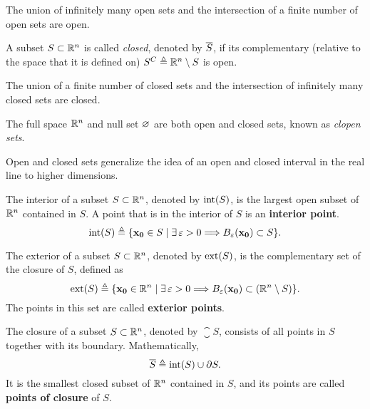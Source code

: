 \begin{prop}
The union of infinitely many open sets and the intersection of a finite number of open sets are open.
\end{prop}

\begin{defn}
	A subset $S\subset\Rtn$ is called \textit{closed}, denoted by $\overline{S}$, if its complementary (relative to the space that it is defined on) $S^C \bydef\Rtn\setminus S$ is open. 
\end{defn}

\begin{prop}
The union of a finite number of closed sets and the intersection of infinitely many closed sets are closed.
\end{prop}

\begin{prop}
    The full space $\Rtn$ and null set $\O$ are both open and closed sets, known as \textit{clopen sets}.
\end{prop}

Open and closed sets generalize the idea of an open and closed interval in the real line to higher dimensions.

\begin{defn}[Interior]
	The interior of a subset $S\subset\Rtn$, denoted by $\interior{S}$, is the largest open subset of $\Rtn$ contained in $S$. 
	A point that is in the interior of $S$ is an \textbf{interior point}.
	\begin{equation}
		\interior{S}\bydef\{\vec{x_0}\in S\st\exists\epsilon > 0\implies B_\epsilon\argopen(\vec{x_0}\argclose)\subset S\}.
	\end{equation}
\end{defn}

\begin{defn}[Exterior]
	The exterior of a subset $S\subset\Rtn$, denoted by $\exterior{S}$, is the complementary set of the closure of $S$, defined as
	\begin{equation}
		\exterior{S}\bydef\{\vec{x_0}\in\Rtn\st\exists\epsilon > 0\implies B_\epsilon\argopen(\vec{x_0}\argclose)\subset
		\left(\Rtn\setminus S\right)\}.
	\end{equation}
	The points in this set are called \textbf{exterior points}.
\end{defn}

\begin{defn}[Closure]
	The closure of a subset $S\subset\Rtn$, denoted by $\closure{S}$, consists of all points in $S$ together with its boundary.
	Mathematically, 
	\begin{equation}
		\closure{S}\bydef\interior{S}\cup\frontier{S}.
	\end{equation}
	It is the smallest closed subset of $\Rtn$ contained in $S$, and its points are called \textbf{points of closure} of $S$.
\end{defn}

